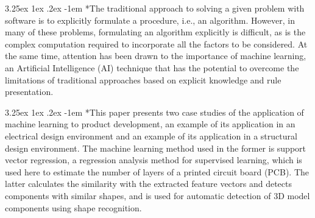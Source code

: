 \documentclass{article}
\makeatletter
\renewcommand\paragraph{\@startsection{paragraph}{4}{\z@}%
	{3.25ex \@plus1ex \@minus.2ex}%
	{-1em}%
	{\normalfont\normalsize}}
\makeatother
\begin{document}
	\paragraph*{The traditional approach to solving a given problem with software is to explicitly formulate a procedure, i.e., an algorithm. However, in many of these problems, formulating an algorithm explicitly is difficult, as is the complex computation required to incorporate all the factors to be considered. At the same time, attention has been drawn to the importance of machine learning, an Artificial Intelligence (AI) technique that has the potential to overcome the limitations of traditional approaches based on explicit knowledge and rule presentation.}
	
	\paragraph*{This paper presents two case studies of the application of machine learning to product development, an example of its application in an electrical design environment and an example of its application in a structural design environment. The machine learning method used in the former is support vector regression, a regression analysis method for supervised learning, which is used here to estimate the number of layers of a printed circuit board (PCB). The latter calculates the similarity with the extracted feature vectors and detects components with similar shapes, and is used for automatic detection of 3D model components using shape recognition.}
	
\end{document}
